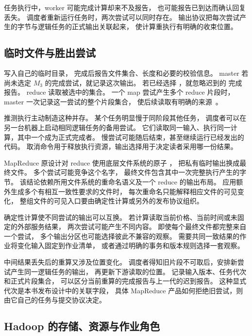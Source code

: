 任务执行中，worker 可能完成计算却来不及报告，
也可能报告已到达而确认回复丢失。
调度者重新运行任务时，两次尝试可以同时存在。
输出协议把每次尝试产生的字节与逻辑任务的正式输出关联起来，
使计算重执行有明确的收束位置。

\subsection{临时文件与胜出尝试}

 写入自己的临时目录，
完成后报告文件集合、长度和必要的校验信息。
master 若尚未选定 $M_3$ 的完成尝试，就记录这次输出。
若已经选择 ，就忽略迟到的  完成报告。
reduce 读取被选中的集合。
一个 map 尝试产生多个 reduce 片段时，
master 一次记录这一尝试的整个片段集合，
使后续读取有明确的来源~\cite{mapreduce-design}。

推测执行主动制造这种并存。
某个任务明显慢于同阶段其他任务，
调度者可以在另一台机器上启动相同逻辑任务的备用尝试。
它们读取同一输入、执行同一计算，其中一个成为正式完成者。
慢尝试可能随后结束，甚至继续运行已经发出的代码。
取消命令用于释放执行资源，输出选择用于决定读者采用哪一份结果。


MapReduce 原设计对 reduce 使用底层文件系统的原子 ，
把私有临时输出换成最终文件。
多个尝试可能竞争这个名字，
最终文件包含其中一次完整执行产生的字节。
该结论依赖所用文件系统的重命名语义及一个 reduce 的输出布局。
应用额外生成多个有相互一致性要求的文件时，
每次重命名只能解释相应文件的可见变化，
整组文件的可见入口要由确定性计算或另外的发布协议组织。

确定性计算使不同尝试的输出可以互换。
若计算读取当前价格、当前时间或未固定的外部服务结果，
两次尝试可能产生不同内容。
即使每个最终文件都完整来自一个尝试，
多个输出分区也可能选择彼此不兼容的观察。
需要共同一致结果的作业将变化输入固定到作业清单，
或者通过明确的事务和版本规则选择一套观察。

中间结果丢失后的重算又涉及位置变化。
调度者得知旧片段不可取后，安排新尝试产生同一逻辑任务的输出，
再更新下游读取的位置。
记录输入版本、任务代次和正式片段集合，
可以区分当前重算的完成报告与上一代的迟到报告。
这种显式代次是本书发布设计中的关联字段，
具体 MapReduce 产品如何拒绝旧尝试，则由它自己的任务与提交协议决定。

\subsection{Hadoop 的存储、资源与作业角色}

